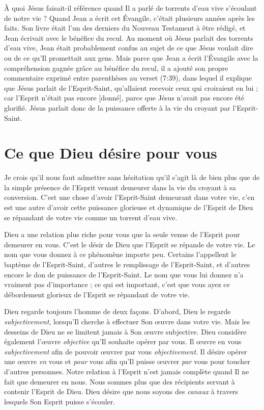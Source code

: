 À quoi Jésus faisait-il référence quand Il a parlé de
 \og torrents d'eau vive \fg{} s'écoulant de notre vie ?
 Quand Jean a écrit cet Évangile, c'était plusieurs années après les faits.
 Son livre était l'un des derniers du Nouveau Testament à être rédigé,
 et Jean écrivait avec le bénéfice du recul. Au moment où Jésus parlait
 des torrents d'eau vive, Jean était probablement confus au sujet de ce que
 Jésus voulait dire ou de ce qu'Il promettait aux gens.
 Mais parce que Jean a écrit l'Évangile avec la compréhension gagnée grâce
 au bénéfice du recul, il a ajouté son propre commentaire exprimé entre
 parenthèses au verset (7:39), dans lequel il explique que Jésus
 parlait de l'Esprit-Saint, \og qu'allaient recevoir ceux qui croiraient
 en lui ; car l'Esprit n'était pas encore [donné], parce que Jésus n'avait
 pas encore été glorifié. \fg{}
 Jésus parlait donc de la puissance offerte à la vie du croyant
 par l'Esprit-Saint.


\section{Ce que Dieu d\'esire pour vous}

Je crois qu'il nous faut admettre sans hésitation qu'il s'agit là de bien
 plus que de la simple présence de l'Esprit venant demeurer dans la vie
 du croyant à sa conversion. C'est une chose d'avoir l'Esprit-Saint
 demeurant dans votre vie, c'en est une autre d'avoir cette puissance
 glorieuse et dynamique de l'Esprit de Dieu se répandant de votre vie
 comme un torrent d'eau vive.

Dieu a une relation plus riche pour vous que la seule venue de l'Esprit
 pour demeurer en vous. C'est le désir de Dieu que l'Esprit se répande
 de votre vie. Le nom que vous donnez à ce phénomène importe peu.
 Certains l'appellent le baptème de l'Esprit-Saint,
 d'autres le remplissage de l'Esprit-Saint, et d'autres encore le don
 de puissance de l'Esprit-Saint. Le nom que vous lui donnez n'a vraiment
 pas d'im\-por\-tan\-ce ; ce qui est important, c'est que vous ayez ce débordement
 glorieux de l'Esprit se répandant de votre vie.

Dieu regarde toujours l'homme de deux façons. D'abord, Dieu le regarde
 \emph{subjectivement}, lorsqu'Il cherche à effectuer Son œuvre
 dans votre vie.
 Mais les desseins de Dieu ne se limitent jamais à Son œuvre subjective.
 Dieu considère également l'œuvre \emph{objective} qu'Il souhaite opérer
 par vous.
 Il œuvre en vous \emph{subjectivement} afin de pouvoir œuvrer par vous
 \emph{objectivement}. Il désire opérer une œuvre \emph{en} vous
 et \emph{pour} vous afin
 qu'Il puisse œuvrer \emph{par} vous pour toucher d'autres personnes.
 Notre relation à l'Esprit n'est jamais complète quand Il ne fait que
 demeurer en nous. Nous sommes plus que des récipients servant à contenir
 l'Esprit de Dieu. Dieu désire que nous soyons des \emph{canaux} à travers
 lesquels Son Esprit puisse s'écouler.


